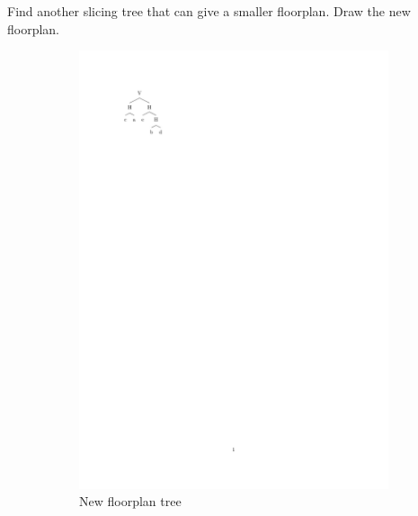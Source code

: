 \documentclass[a4paper, 10pt]{article}
\begin{document}
\newpage

{\color{statement} Find another slicing tree that can give a smaller floorplan. Draw the new floorplan.}

\begin{figure}[H]
    \centering
    \begin{subfigure}{0.52\textwidth}
        \centering
        \includegraphics[trim=50 670 400 75,clip,width=1\linewidth]{tree2.pdf}
        \caption{New floorplan tree}
        \label{}
    \end{subfigure}
    \hspace{10mm}
    \begin{subfigure}{0.35\textwidth}
        \centering

\end{subfigure}
\end{figure}
\end{document}
